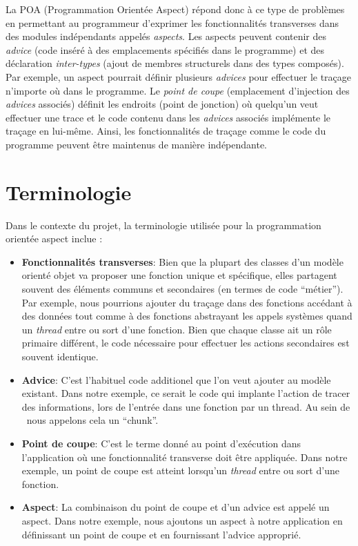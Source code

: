 \documentclass[french]{rtxreport}
\begin{document}
La POA (Programmation Orientée Aspect) répond donc à ce type de problèmes en
permettant au programmeur d'exprimer les fonctionnalités transverses dans des
modules indépendants appelés \emph{aspects}. Les aspects peuvent contenir des
\emph{advice} (code inséré à des emplacements spécifiés dans le programme) et
des déclaration \emph{inter-types} (ajout de membres structurels dans des types
composés). Par exemple, un aspect pourrait définir plusieurs \emph{advices} pour
effectuer le traçage n'importe où dans le programme. Le \emph{point de coupe}
(emplacement d'injection des \emph{advices} associés) définit les endroits
(point de jonction) où quelqu'un veut effectuer une trace et le code contenu
dans les \emph{advices} associés implémente le traçage en lui-même. Ainsi, les
fonctionnalités de traçage comme le code du programme peuvent être maintenus de
manière indépendante.

\section{Terminologie}
Dans le contexte du projet, la terminologie utilisée pour la programmation
orientée aspect inclue :

\begin{itemize}
    \item \textbf{Fonctionnalités transverses}: Bien que la plupart des classes
        d'un modèle orienté objet va proposer une fonction unique et
        spécifique, elles partagent souvent des éléments communs et secondaires
        (en termes de code ``métier''). Par exemple, nous pourrions ajouter du
        traçage dans des fonctions accédant à des données tout comme à des
        fonctions abstrayant les appels systèmes quand un \emph{thread} entre
        ou sort d'une fonction. Bien que chaque classe ait un rôle primaire
        différent, le code nécessaire pour effectuer les actions secondaires
        est souvent identique.
    \item \textbf{Advice}: C'est l'habituel code additionel que l'on veut
        ajouter au modèle existant. Dans notre exemple, ce serait le code qui
        implante l'action de tracer des informations, lors de l'entrée dans une
        fonction par un thread. Au sein de \rtx\ nous appelons cela un
        ``chunk''.
    \item \textbf{Point de coupe}: C'est le terme donné au point d'exécution
        dans l'application où une fonctionnalité transverse doit être
        appliquée.  Dans notre exemple, un point de coupe est atteint lorsqu'un
        \emph{thread} entre ou sort d'une fonction.
    \item \textbf{Aspect}: La combinaison du point de coupe et d'un advice est
        appelé un aspect. Dans notre exemple, nous ajoutons un aspect à notre
        application en définissant un point de coupe et en fournissant l'advice
        approprié.
\end{itemize}
\end{document}
